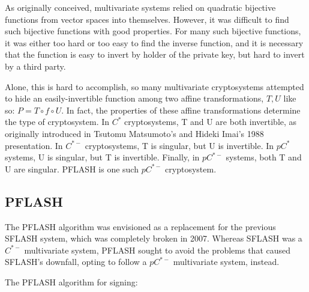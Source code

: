 \documentclass{article}
\begin{document}
As originally conceived, multivariate systems relied on quadratic bijective functions from vector spaces into themselves. However, it was difficult to find such bijective functions with good properties. For many such bijective functions, it was either too hard or too easy to find the inverse function, and it is necessary that the function is easy to invert by holder of the private key, but hard to invert by a third party.\cite{cartor17eflash}

Alone, this is hard to accomplish, so many multivariate cryptosystems attempted to hide an easily-invertible function among two affine transformations, $ T, U $ like so: $ P = T \circ f \circ U$. In fact, the properties of these affine transformations determine the type of cryptosystem. In $ C^* $ cryptosystems, T and U are both invertible, as originally introduced in Tsutomu Matsumoto's and Hideki Imai's 1988 presentation.\cite{matsumoto88}\cite{chen15} In $ C^{*-}$ cryptosystems, T is singular, but U is invertible. In $ p C^* $ systems, U is singular, but T is invertible. Finally, in $ p C^{*-} $ systems, both T and U are singular. PFLASH is one such $ p C^{*-} $ cryptosystem.\cite{chen15}

\subsection{PFLASH}

The PFLASH algorithm was envisioned as a replacement for the previous SFLASH system, which was completely broken in 2007. Whereas SFLASH was a $ C^{*-} $ multivariate system, PFLASH sought to avoid the problems that caused SFLASH's downfall, opting to follow a $ p C^{*-} $ multivariate system, instead.\cite{chen15}

The PFLASH algorithm for signing:\cite{chen15}
\end{document}
